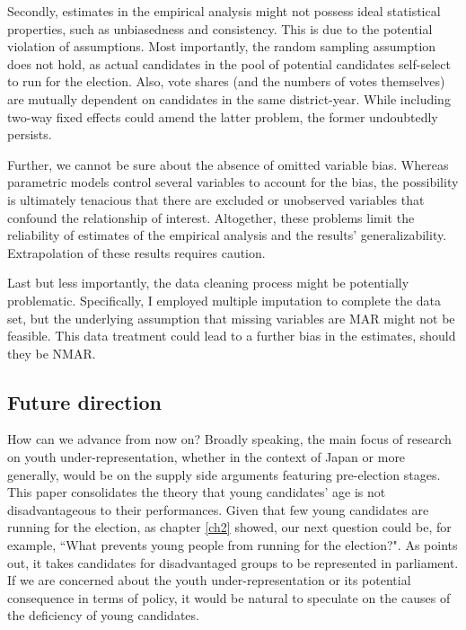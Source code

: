 \documentclass[a4paper, 12pt]{article}\usepackage[dvipdfmx]{graphicx}\usepackage[]{xcolor}
\begin{document}
Secondly, estimates in the empirical analysis might not possess ideal statistical properties, such as unbiasedness and consistency. This is due to the potential violation of assumptions. Most importantly, the random sampling assumption does not hold, as actual candidates in the pool of potential candidates self-select to run for the election. Also, vote shares (and the numbers of votes themselves) are mutually dependent on candidates in the same district-year. While including two-way fixed effects could amend the latter problem, the former undoubtedly persists.

Further, we cannot be sure about the absence of omitted variable bias. Whereas parametric models control several variables to account for the bias, the possibility is ultimately tenacious that there are excluded or unobserved variables that confound the relationship of interest. Altogether, these problems limit the reliability of estimates of the empirical analysis and the results' generalizability. Extrapolation of these results requires caution. 

Last but less importantly, the data cleaning process might be potentially problematic. Specifically, I employed multiple imputation to complete the data set, but the underlying assumption that missing variables are MAR might not be feasible. This data treatment could lead to a further bias in the estimates, should they be NMAR. 

\subsection{Future direction} \label{ch6.4}

How can we advance from now on? Broadly speaking, the main focus of research on youth under-representation, whether in the context of Japan or more generally, would be on the supply side arguments featuring pre-election stages. This paper consolidates the theory that young candidates' age is not disadvantageous to their performances. Given that few young candidates are running for the election, as chapter \ref{ch2} showed, our next question could be, for example, ``What prevents young people from running for the election?". As \citet{lawless2010still} points out, it takes candidates for disadvantaged groups to be represented in parliament. If we are concerned about the youth under-representation or its potential consequence in terms of policy, it would be natural to speculate on the causes of the deficiency of young candidates. 
\end{document}
